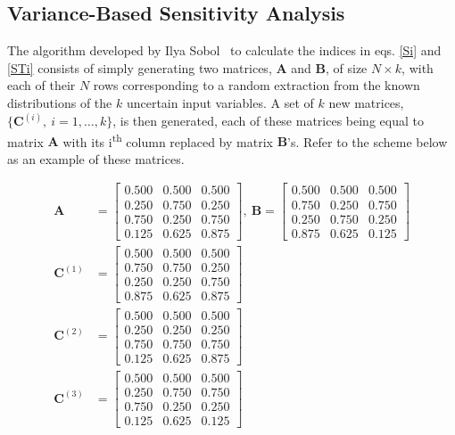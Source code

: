 \documentclass[a4paper,twocolumn,aps,prd,longbibliography,superscriptaddress]{revtex4-1}
\begin{document}
\subsection{Variance-Based Sensitivity Analysis}
The algorithm developed by Ilya Sobol~\cite{Sobol} to calculate the indices in eqs. \eqref{Si} and \eqref{STi} consists of simply generating two matrices, $\mathbf{A}$ and $\mathbf{B}$, of size $N\times k$, with each of their $N$ rows corresponding to a random extraction from the known distributions of the $k$ uncertain input variables.
A set of $k$ new matrices, $\{\mathbf{C}^{(i)},\ i=1,\dots,k\}$, is then generated, each of these matrices being equal to matrix $\mathbf{A}$ with its i\textsuperscript{th} column replaced by matrix $\mathbf{B}$'s. Refer to the scheme below as an example of these matrices.

\begin{equation*}
\begin{split}
\mathbf{A}&=
 \begin{bmatrix}
  0.500 & 0.500 & 0.500 \\
  0.250 & 0.750 & 0.250 \\
  0.750 & 0.250  & 0.750 \\
  0.125 & 0.625 & 0.875 
 \end{bmatrix},\ \mathbf{B}=\begin{bmatrix}
  0.500 & 0.500 & 0.500 \\
  0.750 & 0.250 & 0.750 \\
  0.250 & 0.750  & 0.250 \\
  0.875 & 0.625 & 0.125 
 \end{bmatrix}\\
 \mathbf{C}^{(1)}&=
 \begin{bmatrix}
  0.500 & 0.500 & 0.500 \\
  0.750 & 0.750 & 0.250 \\
  0.250 & 0.250  & 0.750 \\
  0.875 & 0.625 & 0.875  
  \end{bmatrix}\\
 \mathbf{C}^{(2)}&=
 \begin{bmatrix}
  0.500 & 0.500 & 0.500 \\
  0.250 & 0.250 & 0.250 \\
  0.750 & 0.750  & 0.750 \\
  0.125 & 0.625 & 0.875  
  \end{bmatrix}\\
  \mathbf{C}^{(3)}&=
 \begin{bmatrix}
  0.500 & 0.500 & 0.500 \\
  0.250 & 0.750 & 0.750 \\
  0.750 & 0.250  & 0.250 \\
  0.125 & 0.625 & 0.125 
   \end{bmatrix}
 \end{split}
\end{equation*}
\end{document}

